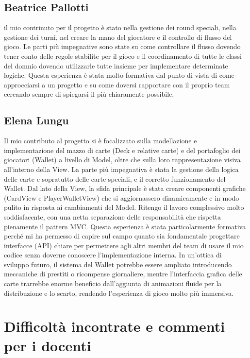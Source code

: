 \documentclass[a4paper,12pt]{report}
\begin{document}
\subsection*{Beatrice Pallotti}
il mio contrinuto per il progetto è stato nella gestione dei round speciali, nella gestione dei turni, nel creare la mano del giocatore e il controllo di flusso del gioco.
Le parti più impegnative sono state su come controllare il flusso dovendo tener conto delle regole stabilite per il gioco e il coordinamento di tutte le classi del domnio dovendo utilizzarle tutte insieme per implementare determinate logiche.
Questa esperienza è stata molto formativa dal punto di vista di come approcciarsi a un progetto e su come doversi rapportare con il proprio team cercando sempre di spiegarsi il più chiaramente possibile.

\subsection*{Elena Lungu}
Il mio contributo al progetto si è focalizzato sulla        
  modellazione e implementazione del mazzo di carte (Deck e   
  relative carte) e del portafoglio dei giocatori (Wallet) a  
  livello di Model, oltre che sulla loro rappresentazione     
  visiva all'interno della View. La parte più impegnativa è   
  stata la gestione della logica delle carte e sopratutto delle carte speciali, e il corretto funzionamento del Wallet. Dal lato della View, la sfida         
  principale è stata creare componenti grafiche (CardView e   
  PlayerWalletView) che si aggiornassero dinamicamente e in   
  modo pulito in risposta ai cambiamenti del Model. Ritengo il
  lavoro complessivo molto soddisfacente, con una netta       
  separazione delle responsabilità che rispetta pienamente il 
  pattern MVC. Questa esperienza è stata particolarmente      
  formativa perché mi ha permesso di capire sul campo quanto  
  sia fondamentale progettare interfacce (API) chiare per     
  permettere agli altri membri del team di usare il mio codice
  senza doverne conoscere l'implementazione interna. In       
  un'ottica di sviluppo futuro, il sistema del Wallet potrebbe
  essere ampliato introducendo meccaniche di prestiti o       
  ricompense giornaliere, mentre l'interfaccia grafica delle  
  carte trarrebbe enorme beneficio dall'aggiunta di animazioni
  fluide per la distribuzione e lo scarto, rendendo           
  l'esperienza di gioco molto più immersiva.  

\section{Difficoltà incontrate e commenti per i docenti}
\end{document}
